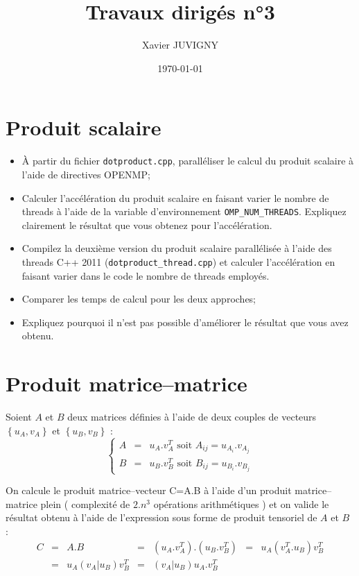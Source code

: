 \documentclass[11pt,a4paper]{article}
\author{Xavier JUVIGNY}
\date{\today}
\title{Travaux dirigés n°3}
\begin{document}
\maketitle
\tableofcontents

\section{Produit scalaire}

\begin{itemize}
\item \`A partir du fichier \texttt{dotproduct.cpp}, paralléliser le calcul du produit scalaire à l'aide de directives OPENMP;
\item Calculer l'accélération du produit scalaire en faisant varier le nombre de threads à l'aide de la variable d'environnement \texttt{OMP\_NUM\_THREADS}. Expliquez clairement le résultat que vous obtenez pour l'accélération. 
\item Compilez la deuxième version du produit scalaire  parallélisée à l'aide des threads C++ 2011 (\texttt{dotproduct\_thread.cpp}) et calculer l'accélération en faisant varier dans le code le nombre de threads employés.
\item Comparer les temps de calcul pour les deux approches;
\item Expliquez pourquoi il n'est pas possible d'améliorer le résultat que vous avez obtenu.
\end{itemize}

\section{Produit matrice--matrice}

Soient $A$ et $B$ deux matrices définies à l'aide de deux couples de vecteurs $\left\{u_{A},v_{A}\right\}$ et 
$\left\{u_{B},v_{B}\right\}$ :
\[
\left\{
	\begin{array}{lcl}
	A & = & u_{A}.v_{A}^{T}\mbox{ soit } A_{ij} = u_{A_{i}}.v_{A_{j}} \\
	B & = & u_{B}.v_{B}^{T}\mbox{ soit } B_{ij} = u_{B_{i}}.v_{B_{j}}
    \end{array}
\right.
\]

On calcule le produit matrice--vecteur C=A.B à l'aide d'un produit matrice--matrice plein ( complexité de $2.n^{3}$ opérations arithmétiques )
et on valide le résultat obtenu à l'aide de l'expression sous forme de produit tensoriel de $A$ et $B$ :
\[
\begin{array}{lclclcl}
C & = & A.B & = & \left(u_{A}.v_{A}^{T}\right).\left(u_{B}.v_{B}^{T}\right) & = &  u_{A}\left(v_{A}^{T}.u_{B}\right)v_{B}^{T}\\
 &=& u_{A}\left(v_{A}|u_{B}\right)v_{B}^{T} & = & \left(v_{A}|u_{B}\right)u_{A}.v_{B}^{T}
 \end{array}
\]
\end{document}
